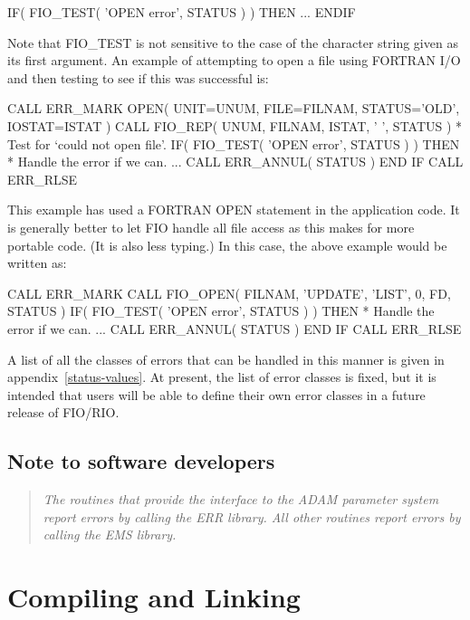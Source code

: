 \documentclass[twoside,11pt,nolof]{starlink}
\begin{document}
\begin{terminalv}
      IF( FIO_TEST( 'OPEN error', STATUS ) ) THEN
         ...
      ENDIF
\end{terminalv}

Note that FIO\_TEST is not sensitive to the case of the character string
given as its first argument. An example of attempting to open a file using
FORTRAN I/O and then testing to see if this was successful is:

\begin{terminalv}
      CALL ERR_MARK
      OPEN( UNIT=UNUM, FILE=FILNAM, STATUS='OLD', IOSTAT=ISTAT )
      CALL FIO_REP( UNUM, FILNAM, ISTAT, ' ', STATUS )
*  Test for `could not open file'.
      IF( FIO_TEST( 'OPEN error', STATUS ) ) THEN
*  Handle the error if we can.
         ...
         CALL ERR_ANNUL( STATUS )
      END IF
      CALL ERR_RLSE
\end{terminalv}

This example has used a FORTRAN OPEN statement in the application code. It is
generally better to let FIO handle all file access as this makes for more
portable code. (It is also less typing.) In this case, the above example would
be written as:

\begin{terminalv}
      CALL ERR_MARK
      CALL FIO_OPEN( FILNAM, 'UPDATE', 'LIST', 0, FD, STATUS )
      IF( FIO_TEST( 'OPEN error', STATUS ) ) THEN
*  Handle the error if we can.
         ...
         CALL ERR_ANNUL( STATUS )
      END IF
      CALL ERR_RLSE
\end{terminalv}

A list of all the classes of errors that can be handled in this manner is given
in appendix~\ref{status-values}. At present, the list of error classes is
fixed, but it is intended that users will be able to define their own error
classes in a future release of FIO/RIO.

\subsection{Note to software developers}
\begin{quote}
\emph{The routines that provide the interface to the ADAM parameter system report
errors by calling the ERR library. All other routines report errors by calling
the EMS library.}
\end{quote}

\section{Compiling and Linking}
\end{document}
